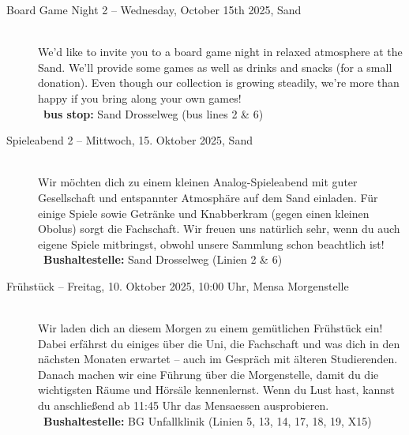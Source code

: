 \begin{description}
\ifml
    \item[Board Game Night 2 -- Wednesday, October 15th 2025, Sand]~\\%
    We'd like to invite you to a board game night in relaxed atmosphere at the Sand.
    We'll provide some games as well as drinks and snacks (for a small donation).
    Even though our collection is growing steadily, we're more than happy if you bring along your own games!\\
    ~\textbf{bus stop:} Sand Drosselweg (bus lines 2 \& 6)
\else
    \item[Spieleabend 2 -- Mittwoch, 15. Oktober 2025, Sand]~\\%
    Wir möchten dich zu einem kleinen Analog-Spieleabend mit guter Gesellschaft und entspannter Atmosphäre auf dem Sand einladen.
    Für einige Spiele sowie Getränke und Knabberkram (gegen einen kleinen Obolus) sorgt die Fachschaft.
    Wir freuen uns natürlich sehr, wenn du auch eigene Spiele mitbringst, obwohl unsere Sammlung schon beachtlich ist!\\
    ~\textbf{Bushaltestelle:} Sand Drosselweg (Linien 2 \& 6)
\fi

\ifbachelor
    \item[Frühstück -- Freitag, 10. Oktober 2025, 10:00 Uhr, Mensa Morgenstelle]\ \\
    Wir laden dich an diesem Morgen zu einem gemütlichen Frühstück ein! Dabei erfährst du einiges über die Uni, die Fachschaft und was dich in den nächsten Monaten erwartet -- auch im Gespräch mit älteren Studierenden.
    Danach machen wir eine Führung über die Morgenstelle, damit du die wichtigsten Räume und Hörsäle kennenlernst.
    Wenn du Lust hast, kannst du anschließend ab 11:45 Uhr das Mensaessen ausprobieren.\\
    ~\textbf{Bushaltestelle:} BG Unfallklinik (Linien 5, 13, 14, 17, 18, 19, X15)
\fi


\end{description}
